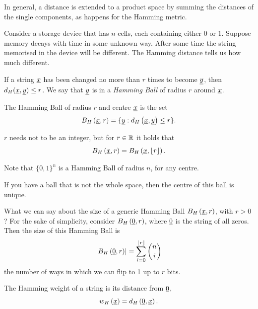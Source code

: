 In general,  a distance is extended to a product space by summing the distances of the single components, as happens for the Hamming metric.

Consider a storage device that has $n$ cells, each containing either $0$ or $1$.
Suppose memory decays with time in some unknown way.
After some time the string memorised in the device will be different.
The Hamming distance tells us how much different.

If a string $\underline{x}$ has been changed no more than $r$ times to become $\underline{y}$, then $d_H(\underline{x}, \underline{y}) \leq r$.
We say that $\underline{y}$ is in a \emph{Hamming Ball} of radius $r$ around $\underline{x}$.

\begin{definition}
	The Hamming Ball of radius $r$ and centre $\underline{x}$ is the set
	\begin{equation}
		B_H\left(\underline{x}, r\right) = \{\underline{y} : d_H \left({\underline{x},\underline{y}}\right) \leq r\}.
	\end{equation}
\end{definition}

\begin{obs}
	$r$ needs not to be an integer, but for $r \in \mathbb{R}$ it holds that
	\begin{equation*}
		B_H\left(\underline{x}, r\right) = B_H\left(\underline{x}, \left\lfloor{r}\right\rfloor\right).
	\end{equation*}
\end{obs}

Note that $\{0,1\}^{n}$ is a Hamming Ball of radius $n$, for any centre.

If you have a ball that is not the whole space, then the centre of this ball is unique.

What we can say about the size of a generic Hamming Ball $B_H\left(\underline{x}, r\right)$, with $r > 0$?
For the sake of simplicity, consider $B_H\left(\underline{0}, r\right)$, where $\underline{0}$ is the string of all zeros.
Then the size of this Hamming Ball is
\begin{equation}\label{eq:volume}
	\left|{B_H\left(\underline{0}, r\right)}\right| = \sum_{i = 0}^{\left\lfloor{r}\right\rfloor} \binom{n}{i}
\end{equation}
\ie the number of ways in which we can flip to 1 up to $r$ bits.

\begin{definition}
	The Hamming weight of a string is its distance from $\underline{0}$, \ie
	\begin{equation}
	w_H\left(\underline{x}\right) = d_H \left({\underline{0},\underline{x}}\right).
	\end{equation}
\end{definition}

